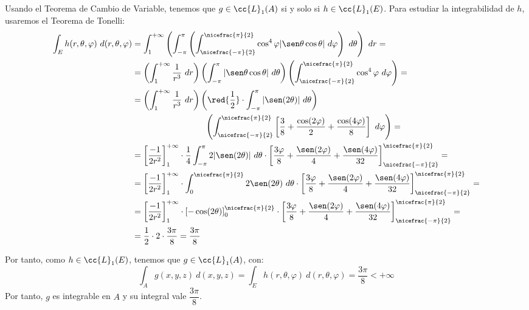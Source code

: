 \begin{ejercicio}
    Usando el Teorema de Cambio de Variable, tenemos que $g\in \cc{L}_1(A)$ si y solo si $h\in \cc{L}_1(E)$. Para estudiar la integrabilidad de $h$, usaremos el Teorema de Tonelli:
    \begin{align*}
        \int_E h(r, \theta, \varphi)~d(r, \theta, \varphi) &=
        \int_1^{+\infty} \left( \int_{-\pi}^{\pi} \left( \int_{\nicefrac{-\pi}{2}}^{\nicefrac{\pi}{2}} \cos^4\varphi|\sen\theta\cos\theta|~d\varphi \right)~d\theta \right)~dr =\\
        &= \left( \int_1^{+\infty} \dfrac{1}{r^3}~dr \right) \left( \int_{-\pi}^{\pi} |\sen\theta\cos\theta|~d\theta \right) \left( \int_{\nicefrac{-\pi}{2}}^{\nicefrac{\pi}{2}} \cos^4\varphi~d\varphi \right) =\\
        &= \left( \int_1^{+\infty} \dfrac{1}{r^3}~dr \right) \left( \red{\dfrac{1}{2}}\cdot \int_{-\pi}^{\pi} |\sen(2\theta)|~d\theta \right)\\&\hspace{3cm}\left( \int_{\nicefrac{-\pi}{2}}^{\nicefrac{\pi}{2}}  \left[\dfrac{3}{8}+\dfrac{\cos(2\varphi)}{2}+\dfrac{\cos(4\varphi)}{8}\right]~d\varphi \right) =\\
        &= \left[\dfrac{-1}{2r^2}\right]_1^{+\infty} \cdot \dfrac{1}{4}\int_{-\pi}^{\pi} 2|\sen(2\theta)|~d\theta \cdot \left[\dfrac{3\varphi}{8}+\dfrac{\sen(2\varphi)}{4}+\dfrac{\sen(4\varphi)}{32}\right]_{\nicefrac{-\pi}{2}}^{\nicefrac{\pi}{2}} =\\
        &= \left[\dfrac{-1}{2r^2}\right]_1^{+\infty} \cdot \int_{0}^{\nicefrac{\pi}{2}} 2\sen(2\theta)~d\theta \cdot \left[\dfrac{3\varphi}{8}+\dfrac{\sen(2\varphi)}{4}+\dfrac{\sen(4\varphi)}{32}\right]_{\nicefrac{-\pi}{2}}^{\nicefrac{\pi}{2}} =\\
        &= \left[\dfrac{-1}{2r^2}\right]_1^{+\infty} \cdot \left[-\cos(2\theta)\right]_0^{\nicefrac{\pi}{2}} \cdot \left[\dfrac{3\varphi}{8}+\dfrac{\sen(2\varphi)}{4}+\dfrac{\sen(4\varphi)}{32}\right]_{\nicefrac{-\pi}{2}}^{\nicefrac{\pi}{2}} =\\
        &= \dfrac{1}{2}\cdot 2 \cdot \dfrac{3\pi}{8} = \dfrac{3\pi}{8}
    \end{align*}

    Por tanto, como $h\in \cc{L}_1(E)$, tenemos que $g\in \cc{L}_1(A)$, con:
    \begin{equation*}
        \int_{A} g(x, y, z)~d(x, y, z) = \int_{E} h(r, \theta, \varphi)~d(r, \theta, \varphi) = \dfrac{3\pi}{8} < +\infty
    \end{equation*}
    Por tanto, $g$ es integrable en $A$ y su integral vale $\dfrac{3\pi}{8}$.
\end{ejercicio}


